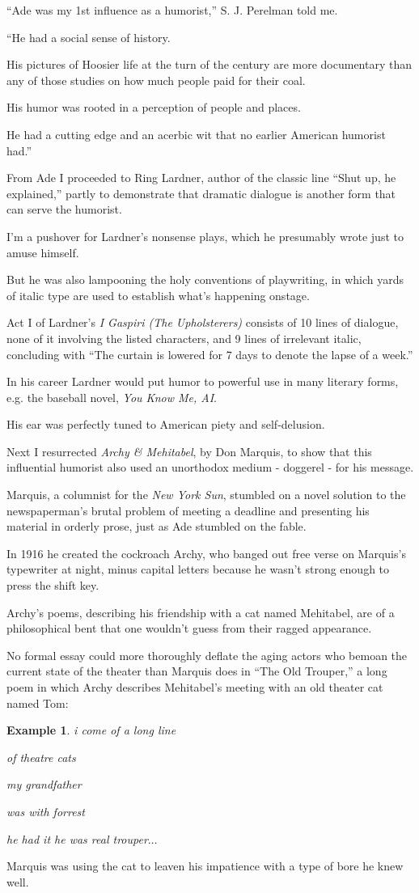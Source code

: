 \documentclass{book}
\numberwithin{equation}{section}
\newtheorem{example}{Example}[chapter]
\begin{document}
``Ade was my 1st influence as a humorist,'' S. J. Perelman told me.

``He had a social sense of history.

His pictures of Hoosier life at the turn of the century are more documentary than any of those studies on how much people paid for their coal.

His humor was rooted in a perception of people and places.

He had a cutting edge and an acerbic wit that no earlier American humorist had.''

%
From Ade I proceeded to Ring Lardner, author of the classic line ``Shut up, he explained,'' partly to demonstrate that dramatic dialogue is another form that can serve the humorist.

I'm a pushover for Lardner's nonsense plays, which he presumably wrote just to amuse himself.

But he was also lampooning the holy conventions of playwriting, in which yards of italic type are used to establish what's happening onstage.

Act I of Lardner's \textit{I Gaspiri (The Upholsterers)} consists of 10 lines of dialogue, none of it involving the listed characters, and 9 lines of irrelevant italic, concluding with ``The curtain is lowered for 7 days to denote the lapse of a week.''

In his career Lardner would put humor to powerful use in many literary forms, e.g. the baseball novel, \textit{You Know Me, AI}.

His ear was perfectly tuned to American piety and self-delusion.

%
Next I resurrected \textit{Archy \& Mehitabel}, by Don Marquis, to show that this influential humorist also used an unorthodox medium - doggerel - for his message.

Marquis, a columnist for the \textit{New York Sun}, stumbled on a novel solution to the newspaperman's brutal problem of meeting a deadline and presenting his material in orderly prose, just as Ade stumbled on the fable.

In 1916 he created the cockroach Archy, who banged out free verse on Marquis's typewriter at night, minus capital letters because he wasn't strong enough to press the shift key.

Archy's poems, describing his friendship with a cat named Mehitabel, are of a philosophical bent that one wouldn't guess from their ragged appearance.

No formal essay could more thoroughly deflate the aging actors who bemoan the current state of the theater than Marquis does in ``The Old Trouper,'' a long poem in which Archy describes Mehitabel's meeting with an old theater cat named Tom:
\begin{example}
    i come of a long line
    
    of theatre cats
    
    my grandfather
    
    was with forrest
    
    he had it he was real trouper$\ldots$
\end{example}
Marquis was using the cat to leaven his impatience with a type of bore he knew well.
\end{document}
